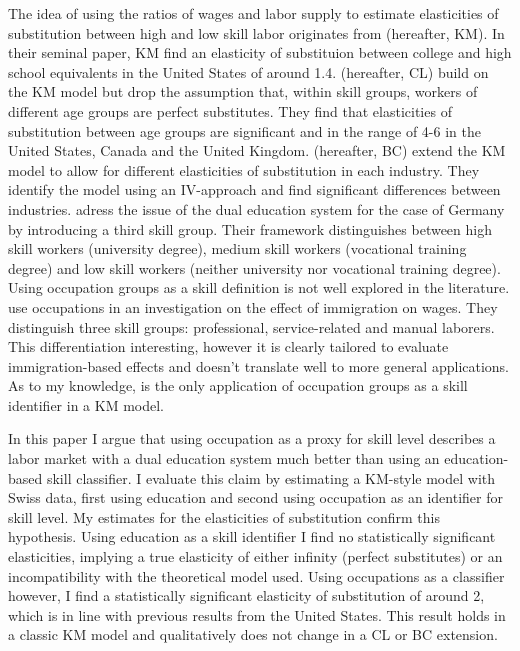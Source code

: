 \documentclass[]{article}
\begin{document}
The idea of using the ratios of wages and labor supply to estimate
elasticities of substitution between high and low skill labor
originates from \cite{Katz.1992} (hereafter, KM). In their seminal
paper, KM find an elasticity of substituion between college and high
school equivalents in the United States of around
1.4. \cite{Card.2001} (hereafter, CL) build on the KM model but drop
the assumption that, within skill groups, workers of different age
groups are perfect substitutes. They find that elasticities of
substitution between age groups are significant and in the range of
4-6 in the United States, Canada and the United
Kingdom. \cite{Blankenau.2011} (hereafter, BC) extend the KM model to
allow for different elasticities of substitution in each
industry. They identify the model using an IV-approach and find
significant differences between industries.  \cite{Fitzenberger.2006}
adress the issue of the dual education system for the case of Germany
by introducing a third skill group. Their framework distinguishes
between high skill workers (university degree), medium skill workers
(vocational training degree) and low skill workers (neither university
nor vocational training degree). Using occupation groups as a skill
definition is not well explored in the
literature. \cite{Orrenius.2007} use occupations in an investigation
on the effect of immigration on wages. They distinguish three skill
groups: professional, service-related and manual laborers. This
differentiation interesting, however it is clearly tailored to
evaluate immigration-based effects and doesn't translate well to more
general applications. As to my knowledge, \cite{Orrenius.2007} is the
only application of occupation groups as a skill identifier in a KM
model.

In this paper I argue that using occupation as a proxy for skill level
describes a labor market with a dual education system much better than
using an education-based skill classifier. I evaluate this claim by
estimating a KM-style model with Swiss data, first using education and
second using occupation as an identifier for skill level. My estimates
for the elasticities of substitution confirm this hypothesis. Using
education as a skill identifier I find no statistically significant
elasticities, implying a true elasticity of either infinity (perfect
substitutes) or an incompatibility with the theoretical model
used. Using occupations as a classifier however, I find a
statistically significant elasticity of substitution of around 2,
which is in line with previous results from the United States. This
result holds in a classic KM model and qualitatively does not change
in a CL or BC extension.
\end{document}
